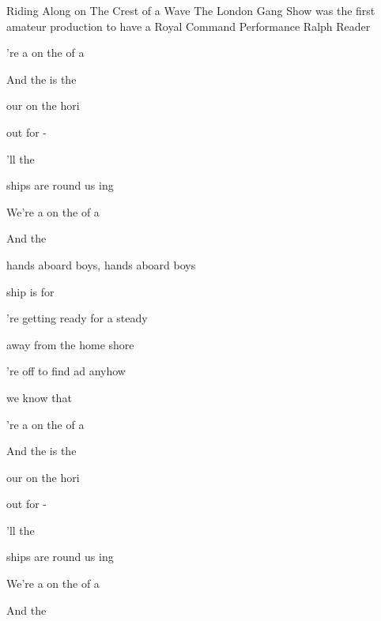 \begin{SBSong}{Riding Along on The Crest of a Wave}
  {The London Gang Show was the first amateur production to have a Royal Command Performance}
  {Ralph Reader}
  \begin{SBChorus}
    're  a on the  of a 
	
    And the  is  the  

     our  on the  hori

     out for - 

    'll  the 
	
      ships are round us ing
	
    We're  a on the  of a  
	
    And the   
  \end{SBChorus}
  \WBPageBrk
  \begin{SBVerse}
     hands aboard boys,   hands aboard boys

     ship is  for  	

    're getting ready  for a steady

     away from the home shore

    're off to find ad anyhow

     we know that  
  \end{SBVerse}
  \begin{SBChorus}
    're  a on the  of a 
	
    And the  is  the  

     our  on the  hori

     out for - 

    'll  the 
	
      ships are round us ing
	
    We're  a on the  of a  
	
    And the   
  \end{SBChorus}
\end{SBSong}
  
